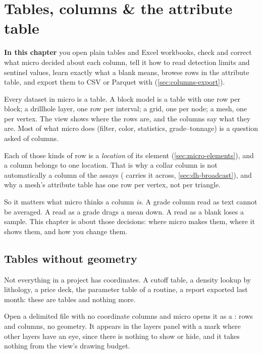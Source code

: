 \chapter{Tables, columns \& the attribute table}\label{ch:columns}
\begin{goals}
\textbf{In this chapter} you open plain tables and Excel workbooks, check and correct what micro decided about each column, tell it how to read detection limits and sentinel values, learn exactly what a blank means, browse rows in the attribute table, and export them to CSV or Parquet with  (\cref{sec:columns-export}).
\end{goals}

Every dataset in micro is a table. A block model is a table with one row per block; a drillhole layer, one row per interval; a grid, one per node; a mesh, one per vertex. The view shows where the rows are, and the columns say what they are. Most of what micro does (filter, color, statistics, grade–tonnage) is a question asked of columns.

\label{sec:columns-locations}Each of those kinds of row is a \emph{location} of its element (\cref{sec:micro-elements}), and a column belongs to one location. That is why a collar column is not automatically a column of the assays ( carries it across, \cref{sec:dh-broadcast}), and why a mesh's attribute table has one row per vertex, not per triangle.

So it matters what micro thinks a column \emph{is}. A grade column read as text cannot be averaged. A  read as a grade drags a mean down. A  read as a blank loses a sample. This chapter is about those decisions: where micro makes them, where it shows them, and how you change them.

\section{Tables without geometry}\label{sec:columns-tables}

Not everything in a project has coordinates. A cutoff table, a density lookup by lithology, a price deck, the parameter table of a routine, a report exported last month: these are tables and nothing more.

Open a delimited file with no coordinate columns and micro opens it as a : rows and columns, no geometry. It appears in the layers panel with a  mark where other layers have an eye, since there is nothing to show or hide, and it takes nothing from the view's drawing budget.

